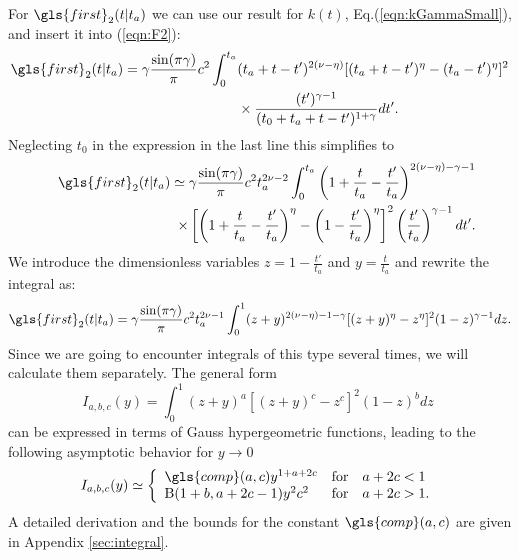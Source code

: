 For $\gls{first}_{2}(t|t_a)$ we can use our result for $k(t)$, Eq.(\ref{eqn:kGammaSmall}), and insert it into (\ref{eqn:F2}): 
\begin{align}
\gls{first}_{2}(t|t_a) = \gamma\frac{\sin(\pi \gamma)}{\pi}  c^2 \int^{t_a}_0 & (t_a+t-t')^{2(\nu-\eta)}[(t_a+t-t')^\eta-(t_a-t')^\eta]^2  \nonumber \\
& \times \frac{(t')^{\gamma-1}}{(t_0+t_a+t-t')^{1+\gamma}} dt'.
\end{align}
%
Neglecting $t_0$ in the expression in the last line this simplifies to
%
\begin{align}
&& \gls{first}_{2}(t|t_a) \simeq  \gamma \frac{\sin(\pi \gamma)}{\pi}  c^2 t_a^{2\nu-2} \int^{t_a}_0 \left(1+\frac{t}{t_a}-\frac{t'}{t_a} \right)^{2(\nu-\eta)-\gamma-1} \nonumber \\
&& \;\; \times \left[ \left(1+\frac{t}{t_a}-\frac{t'}{t_a} \right)^\eta-\left(1- \frac{t'}{t_a}\right)^\eta \right]^2 \left( \frac{t'}{t_a}\right)^{\gamma-1} dt' .
\end{align}
%
We introduce the dimensionless variables $z = 1-\frac{t'}{t_a}$ and $y = \frac{t}{t_a}$ and rewrite the integral as:
%
\begin{align}
 \gls{first}_{2}(t|t_a) = \gamma \frac{\sin(\pi \gamma)}{\pi}  c^2 t_a^{2\nu-1}  \int^{1}_0 (z+y)^{2(\nu-\eta)-1-\gamma}[(z+y)^\eta-z^\eta]^2 (1-z)^{\gamma-1} dz . 
\end{align}
Since we are going to encounter integrals of this type several times, we will calculate them separately. The general form
\begin{equation}
I_{a,b,c}(y) = \int^{1}_0 (z+y)^{a}[(z+y)^c-z^c]^2 (1-z)^{b} dz \;  \label{eqn:Iabc} 
\end{equation}
can be expressed in terms of Gauss hypergeometric functions, leading to the following asymptotic behavior for $y \to 0$
\begin{equation}
I_{a,b,c}(y) \simeq \left\{ \begin{array}{l l l}
\gls{comp}(a,c) y^{1+a+2c}    & \mathrm{for} &  a+2c < 1 \\
 \mathrm{B}(1+b,a+2c-1)y^2 c^2  & \mathrm{for} & a+2c > 1.
\end{array} \right. \label{eqn:IabcAsymptotic}
\end{equation}
A detailed derivation and the bounds for the constant $\gls{comp}(a,c)$ are given in Appendix \ref{sec:integral}.


